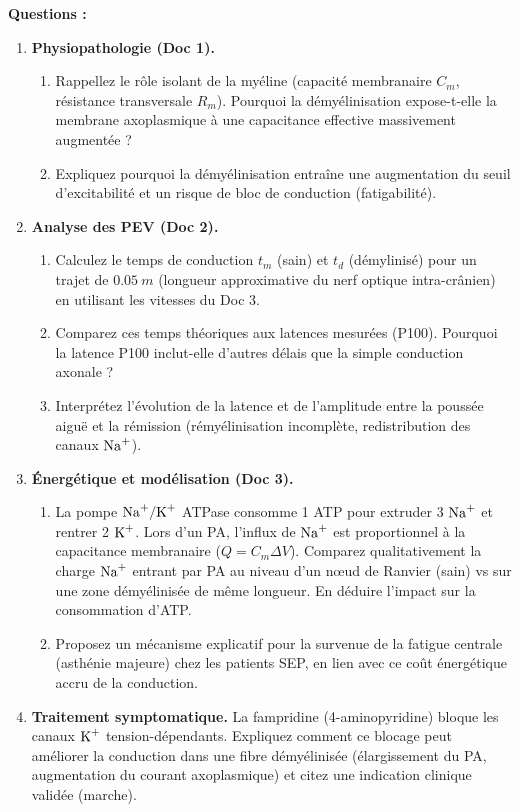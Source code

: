 \documentclass[11pt]{article}
\begin{document}
\begin{exercice}
\textbf{Questions :}
\begin{enumerate}
    \item \textbf{Physiopathologie (Doc 1).}
    \begin{enumerate}
        \item Rappellez le rôle isolant de la myéline (capacité membranaire $C_m$, résistance transversale $R_m$). Pourquoi la démyélinisation expose-t-elle la membrane axoplasmique à une capacitance effective massivement augmentée ?
        \item Expliquez pourquoi la démyélinisation entraîne une augmentation du seuil d'excitabilité et un risque de bloc de conduction (fatigabilité).
    \end{enumerate}
    \item \textbf{Analyse des PEV (Doc 2).}
    \begin{enumerate}
        \item Calculez le temps de conduction $t_m$ (sain) et $t_d$ (démylinisé) pour un trajet de $\SI{0,05}{m}$ (longueur approximative du nerf optique intra-crânien) en utilisant les vitesses du Doc 3.
        \item Comparez ces temps théoriques aux latences mesurées (P100). Pourquoi la latence P100 inclut-elle d'autres délais que la simple conduction axonale ?
        \item Interprétez l'évolution de la latence et de l'amplitude entre la poussée aiguë et la rémission (rémyélinisation incomplète, redistribution des canaux $\ce{Na+}$).
    \end{enumerate}
    \item \textbf{Énergétique et modélisation (Doc 3).}
    \begin{enumerate}
        \item La pompe $\ce{Na+/K+}$ ATPase consomme 1 ATP pour extruder 3 $\ce{Na+}$ et rentrer 2 $\ce{K+}$. Lors d'un PA, l'influx de $\ce{Na+}$ est proportionnel à la capacitance membranaire ($Q = C_m \Delta V$). Comparez qualitativement la charge $\ce{Na+}$ entrant par PA au niveau d'un nœud de Ranvier (sain) vs sur une zone démyélinisée de même longueur. En déduire l'impact sur la consommation d'ATP.
        \item Proposez un mécanisme explicatif pour la survenue de la fatigue centrale (asthénie majeure) chez les patients SEP, en lien avec ce coût énergétique accru de la conduction.
    \end{enumerate}
    \item \textbf{Traitement symptomatique.} La fampridine (4-aminopyridine) bloque les canaux $\ce{K+}$ tension-dépendants. Expliquez comment ce blocage peut améliorer la conduction dans une fibre démyélinisée (élargissement du PA, augmentation du courant axoplasmique) et citez une indication clinique validée (marche).
\end{enumerate}
\end{exercice}
\end{document}
